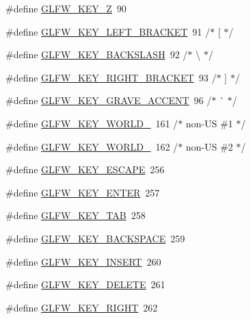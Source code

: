 \begin{DoxyCompactItemize}
\item 
\#define \mbox{\hyperlink{group__keys_gac489e208c26afda8d4938ed88718760a}{G\+L\+F\+W\+\_\+\+K\+E\+Y\+\_\+Z}}~90
\item 
\#define \mbox{\hyperlink{group__keys_gad1c8d9adac53925276ecb1d592511d8a}{G\+L\+F\+W\+\_\+\+K\+E\+Y\+\_\+\+L\+E\+F\+T\+\_\+\+B\+R\+A\+C\+K\+ET}}~91  /$\ast$ \mbox{[} $\ast$/
\item 
\#define \mbox{\hyperlink{group__keys_gab8155ea99d1ab27ff56f24f8dc73f8d1}{G\+L\+F\+W\+\_\+\+K\+E\+Y\+\_\+\+B\+A\+C\+K\+S\+L\+A\+SH}}~92  /$\ast$ \textbackslash{} $\ast$/
\item 
\#define \mbox{\hyperlink{group__keys_ga86ef225fd6a66404caae71044cdd58d8}{G\+L\+F\+W\+\_\+\+K\+E\+Y\+\_\+\+R\+I\+G\+H\+T\+\_\+\+B\+R\+A\+C\+K\+ET}}~93  /$\ast$ \mbox{]} $\ast$/
\item 
\#define \mbox{\hyperlink{group__keys_ga7a3701fb4e2a0b136ff4b568c3c8d668}{G\+L\+F\+W\+\_\+\+K\+E\+Y\+\_\+\+G\+R\+A\+V\+E\+\_\+\+A\+C\+C\+E\+NT}}~96  /$\ast$ \`{} $\ast$/
\item 
\#define \mbox{\hyperlink{group__keys_gadc78dad3dab76bcd4b5c20114052577a}{G\+L\+F\+W\+\_\+\+K\+E\+Y\+\_\+\+W\+O\+R\+L\+D\+\_}}~161 /$\ast$ non-\/US \#1 $\ast$/
\item 
\#define \mbox{\hyperlink{group__keys_ga20494bfebf0bb4fc9503afca18ab2c5e}{G\+L\+F\+W\+\_\+\+K\+E\+Y\+\_\+\+W\+O\+R\+L\+D\+\_}}~162 /$\ast$ non-\/US \#2 $\ast$/
\item 
\#define \mbox{\hyperlink{group__keys_gaac6596c350b635c245113b81c2123b93}{G\+L\+F\+W\+\_\+\+K\+E\+Y\+\_\+\+E\+S\+C\+A\+PE}}~256
\item 
\#define \mbox{\hyperlink{group__keys_ga9555a92ecbecdbc1f3435219c571d667}{G\+L\+F\+W\+\_\+\+K\+E\+Y\+\_\+\+E\+N\+T\+ER}}~257
\item 
\#define \mbox{\hyperlink{group__keys_ga6908a4bda9950a3e2b73f794bbe985df}{G\+L\+F\+W\+\_\+\+K\+E\+Y\+\_\+\+T\+AB}}~258
\item 
\#define \mbox{\hyperlink{group__keys_ga6c0df1fe2f156bbd5a98c66d76ff3635}{G\+L\+F\+W\+\_\+\+K\+E\+Y\+\_\+\+B\+A\+C\+K\+S\+P\+A\+CE}}~259
\item 
\#define \mbox{\hyperlink{group__keys_ga373ac7365435d6b0eb1068f470e34f47}{G\+L\+F\+W\+\_\+\+K\+E\+Y\+\_\+\+I\+N\+S\+E\+RT}}~260
\item 
\#define \mbox{\hyperlink{group__keys_gadb111e4df74b8a715f2c05dad58d2682}{G\+L\+F\+W\+\_\+\+K\+E\+Y\+\_\+\+D\+E\+L\+E\+TE}}~261
\item 
\#define \mbox{\hyperlink{group__keys_ga06ba07662e8c291a4a84535379ffc7ac}{G\+L\+F\+W\+\_\+\+K\+E\+Y\+\_\+\+R\+I\+G\+HT}}~262

\end{DoxyCompactItemize}
